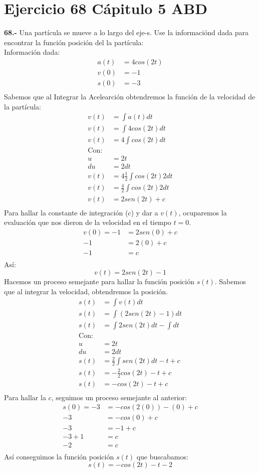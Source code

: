 \chapter*{Ejercicio 68 Cápitulo 5 ABD }

\textbf{68.-} Una partícula se mueve a lo largo del eje-s. Use la informaciónd dada para encontrar la función posición del la partícula: \\
Información dada:
\begin{align*}
    a(t) &= 4cos(2t) \\
    v(0) &= -1 \\
    s(0) &= -3 \\
\end{align*}
Sabemos que al Integrar la Acelearción obtendremos la función de la velocidad de la partícula:
\begin{align*}
    v(t)&=\int a(t)dt \\
    v(t)&=\int 4cos(2t)dt \\
    v(t)&= 4\int cos(2t)dt \\
    \text{Con:} \\
    u   &= 2t \\
    du  &= 2dt \\
    v(t)&= 4\frac{1}{2}\int cos(2t)2dt \\
    v(t)&= \frac{4}{2}\int cos(2t)2dt \\
    v(t)&= 2sen(2t) + c\\
\end{align*}
Para hallar la constante de integración ($c$) y dar a $v(t)$, ocuparemos la evaluación que nos dieron de la velocidad en el tiempo $t=0$.
\begin{align*}
    v(0) = -1 &= 2sen(0) +c \\
    -1 &= 2(0) + c \\
    -1 &= c \\
\end{align*}
Así: 
\[
v(t) = 2sen(2t)-1
\]
Hacemos un proceso semejante para hallar la función posición $s(t)$.
Sabemos que al integrar la velocidad, obtendremos la posición.
\begin{align*}
    s(t)&=\int v(t)dt \\
    s(t)&=\int (2sen(2t) -1 )dt \\
    s(t)&= \int 2sen(2t)dt - \int dt  \\
    \text{Con:} \\
    u   &= 2t \\
    du  &= 2dt \\
    s(t)&= \frac{2}{2}\int sen(2t)dt - t + c \\
    s(t)&= -\frac{2}{2} cos(2t) - t + c \\
    s(t)&= - cos(2t) - t + c \\
\end{align*}
Para hallar la $c$, seguimos un proceso semejante al anterior:
\begin{align*}
    s(0) = -3 &= - cos(2(0)) - (0) + c \\
    -3 &= - cos(0)+ c  \\
    -3 &=  - 1 +c \\
    -3 +1 &= c \\
    -2 &= c \\
\end{align*}
Así conseguimos la función posición $s(t)$ que buscabamos:
\[
s(t) = -cos(2t)-t-2
\]
